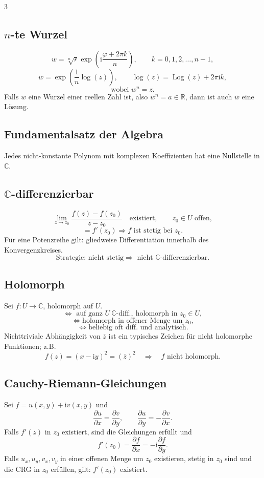 \documentclass[a4paper,landscape]{article}
\newcommand{\C}{\mathbb C}
\newcommand{\R}{\mathbb R}
\newcommand{\ii}{\mathrm i}
\DeclareMathOperator{\Log}{Log}
\begin{document}
\begin{multicols*}{3}
\subsection*{$n$-te Wurzel}
\[
w=\sqrt[n]{r}\exp\left(\ii\frac{\varphi+2\pi k}{n}\right),\qquad k=0,1,2,\ldots,n-1,
\]
\[
w=\exp\left(\frac1n\log(z)\right),\qquad \log(z)=\Log(z)+2\pi \ii k,
\]
\[
\text{wobei }w^n=z.
\]
Falls $w$ eine Wurzel einer reellen Zahl ist, also $w^n=a\in\R$, dann ist auch $\overline w$ eine Lösung.

\subsection*{Fundamentalsatz der Algebra}
Jedes nicht-konstante Polynom mit komplexen Koeffizienten hat eine Nullstelle in $\C$.

\subsection*{$\C$-differenzierbar}
\[
\lim_{z\to z_0}\frac{f(z)-f(z_0)}{z-z_0}\quad\text{existiert},\qquad z_0\in U\text{ offen},
\]
\[
=f'(z_0)\Rightarrow f\text{ ist stetig bei }z_0.
\]
Für eine Potenzreihe gilt: gliedweise Differentiation innerhalb des Konvergenzkreises.
\[
\text{Strategie: nicht stetig}\Rightarrow\text{ nicht }\C\text{-differenzierbar}.
\]

\subsection*{Holomorph}
Sei $f:U\to\C$, holomorph auf $U$.
\[
\Leftrightarrow \text{ auf ganz }U\ \C\text{-diff.},\ \text{holomorph in }z_0\in U,
\]
\[
\Leftrightarrow \text{holomorph in offener Menge um }z_0,
\]
\[
\Leftrightarrow \text{beliebig oft diff. und analytisch}.
\]
Nichttriviale Abhängigkeit von $\overline z$ ist ein typisches Zeichen für nicht holomorphe Funktionen; z.B.
\[
f(z)=(x-\ii y)^2=(\overline z)^2\quad\Rightarrow\quad f\text{ nicht holomorph}.
\]

\subsection*{Cauchy-Riemann-Gleichungen}
Sei $f=u(x,y)+\ii v(x,y)$ und
\[
\frac{\partial u}{\partial x}=\frac{\partial v}{\partial y},\qquad
\frac{\partial u}{\partial y}=-\frac{\partial v}{\partial x}.
\]
Falls $f'(z)$ in $z_0$ existiert, sind die Gleichungen erfüllt und
\[
f'(z_0)=\frac{\partial f}{\partial x}=-\ii\frac{\partial f}{\partial y}.
\]
Falls $u_x,u_y,v_x,v_y$ in einer offenen Menge um $z_0$ existieren, stetig in $z_0$ sind und die CRG in $z_0$ erfüllen, gilt: $f'(z_0)$ existiert.


\end{multicols*}
\end{document}
